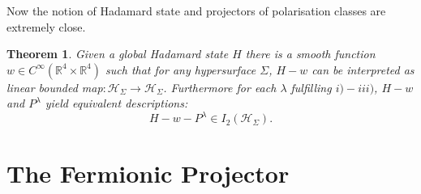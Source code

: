 \documentclass[a4paper,11pt]{article}
\newtheorem{thm}{Theorem}
\begin{document}
Now the notion of Hadamard state and  projectors of polarisation classes are extremely close.

\begin{thm}
Given a global Hadamard state \(H\) there is a smooth function  \(w\in C^\infty(\mathbb{R}^4\times \mathbb{R}^4)\) such that
for any hypersurface \(\Sigma\), \(H-w\) can be interpreted as linear bounded map\(:\mathcal{H}_\Sigma\rightarrow \mathcal{H}_\Sigma\).
Furthermore for each \(\lambda\) fulfilling \(i)-iii)\), \(H-w\) and \(P^\lambda\) yield equivalent descriptions:
\begin{equation}
H-w-P^\lambda \in I_2(\mathcal{H}_\Sigma).
\end{equation}


\end{thm}




\section{The Fermionic Projector}






\end{document}
